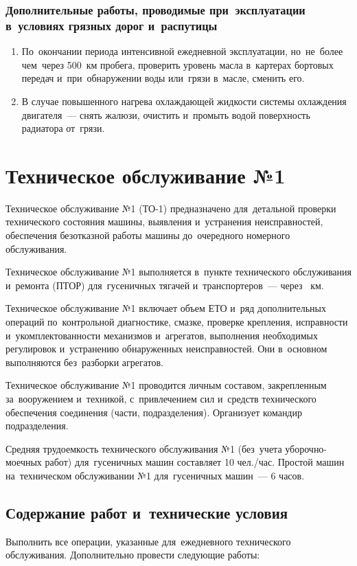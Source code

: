 \subsubsection{Дополнительные работы, проводимые при~эксплуатации в~условиях грязных дорог и~распутицы}
\begin{enumerate}
    \item По~окончании периода интенсивной ежедневной эксплуатации, но~не~более чем~через 500~км пробега, проверить уровень масла в~картерах бортовых передач и~при~обнаружении воды или~грязи в~масле, сменить его. 
    \item В случае повышенного нагрева охлаждающей жидкости системы охлаждения двигателя~--- снять жалюзи, очистить и~промыть водой поверхность радиатора от~грязи.

\end{enumerate}


\section{Техническое обслуживание №1}
Техническое обслуживание №1 (ТО-1) предназначено для~детальной проверки технического состояния машины, выявления и~устранения неисправностей, обеспечения безотказной работы машины до~очередного номерного обслуживания.

Техническое обслуживание №1 выполняется в~пункте технического обслуживания и~ремонта (ПТОР) для~гусеничных тягачей и~транспортеров~--- через ~км. 

Техническое обслуживание №1 включает объем ЕТО и~ряд дополнительных операций по~контрольной диагностике, смазке, проверке крепления, исправности и~укомплектованности механизмов и~агрегатов, выполнения необходимых регулировок и~устранению обнаруженных неисправностей. Они в~основном выполняются без~разборки агрегатов.

Техническое обслуживание №1 проводится личным составом, закрепленным за~вооружением и~техникой, с~привлечением сил и~средств технического обеспечения соединения (части, подразделения). Организует командир подразделения.

Средняя трудоемкость технического обслуживания №1 (без~учета уборочно-моечных работ) для~гусеничных машин составляет 10 чел./час. Простой машин на~техническом обслуживании №1 для~гусеничных машин~--- 6 часов. 

\subsection{Содержание работ и~технические условия}
Выполнить все операции, указанные для~ежедневного технического обслуживания. Дополнительно провести следующие работы: 


